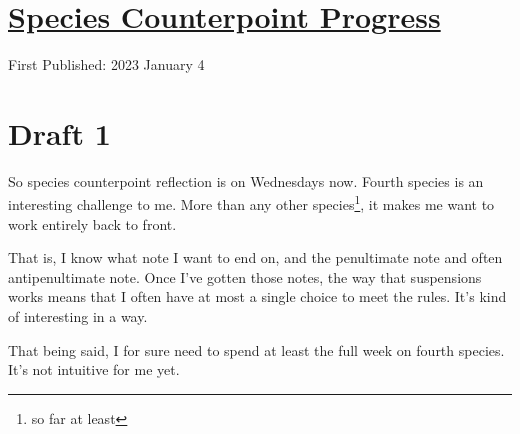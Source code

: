 \documentclass[12pt]{article}[titlepage]
\newcommand{\1}{\={a}}
\newcommand{\2}{\={e}}
\newcommand{\3}{\={\i}}
\newcommand{\4}{\=o}
\newcommand{\5}{\=u}
\newcommand{\6}{\={A}}
\renewcommand{\,}{\textsuperscript{,}}
\begin{document}
\doublespacing
\section{\href{species-counterpoint-4.html}{Species Counterpoint Progress}}
First Published: 2023 January 4

\section{Draft 1}
So species counterpoint reflection is on Wednesdays now.
Fourth species is an interesting challenge to me.
More than any other species\footnote{so far at least}, it makes me want to work entirely back to front.

That is, I know what note I want to end on, and the penultimate note and often antipenultimate note.
Once I've gotten those notes, the way that suspensions works means that I often have at most a single choice to meet the rules.
It's kind of interesting in a way.

That being said, I for sure need to spend at least the full week on fourth species.
It's not intuitive for me yet.
\end{document}
